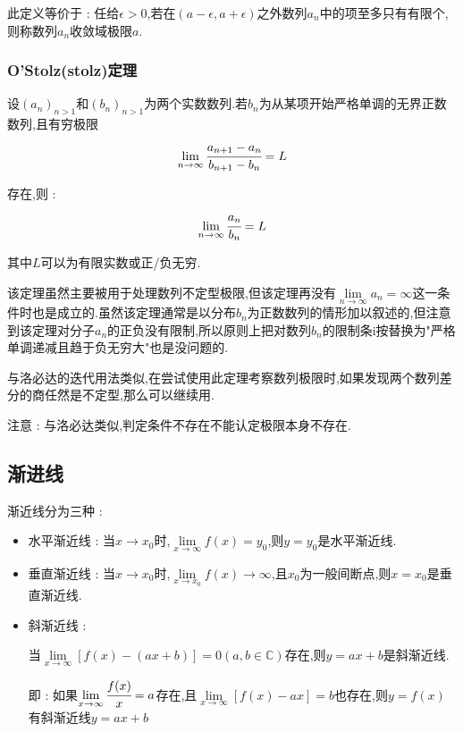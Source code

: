 \documentclass[UTF8,12pt]{ctexbook}
\newcommand{\limNormal}[1]{\lim\limits_{#1}}
\newcommand{\myLimToInf}{\limNormal{x \to \infty}}
\newcommand{\defFunction}[1]{f(#1)}
\newcommand{\mathConstant}{\mathbb{C}}
\begin{document}
{{{{    此定义等价于 : 任给$\epsilon > 0$,若在$(a - \epsilon,a + \epsilon)$之外数列${a_n}$中的项至多只有有限个,则称数列${a_n}$收敛域极限$a$.
  }%

  \subsubsection{O'Stolz(stolz)定理}{
    设$(a_n)_{n > 1}$和$(b_n)_{n > 1}$为两个实数数列.若$b_n$为从某项开始严格单调的无界正数数列,且有穷极限
    $$
      \limNormal{n \to \infty}\cfrac{a_{n + 1} - a_n}{b_{n + 1} - b_n} = L
    $$

    存在,则 :
    $$
      \limNormal{n \to \infty}\cfrac{a_n}{b_n} = L
    $$

    其中$L$可以为有限实数或正/负无穷.

    该定理虽然主要被用于处理数列不定型极限,但该定理再没有$\limNormal{n \to \infty}a_n = \infty$这一条件时也是成立的.虽然该定理通常是以分布$b_n$为正数数列的情形加以叙述的,但注意到该定理对分子$a_n$的正负没有限制,所以原则上把对数列$b_n$的限制条i按替换为"严格单调递减且趋于负无穷大"也是没问题的.

    与洛必达的迭代用法类似,在尝试使用此定理考察数列极限时,如果发现两个数列差分的商任然是不定型,那么可以继续用.

    注意 : 与洛必达类似,判定条件不存在不能认定极限本身不存在.
  }%

}%

\subsection{渐进线}{
  渐近线分为三种 :
  \begin{itemize}
    \item 水平渐近线 : 当$x \to x_0$时,$\myLimToInf\defFunction{x} = y_0$,则$y = y_0$是水平渐近线.
    \item 垂直渐近线 : 当$x \to x_0$时,$\limNormal{x \to x_0}\defFunction{x} \to \infty$,且$x_0$为一般间断点,则$x = x_0$是垂直渐近线.
    \item {
          斜渐近线 :

          当$\myLimToInf\left[\defFunction{x} - (ax + b)\right] = 0(a,b \in \mathConstant)$存在,则$y = ax + b$是斜渐近线.

          即 : 如果$\myLimToInf\cfrac{\defFunction{x}}{x} = a$存在,且$\myLimToInf\left[\defFunction{x} - ax\right] = b$也存在,则$y = \defFunction{x}$有斜渐近线$y = ax + b$
          }
  \end{itemize}
}%

}}
\end{document}
